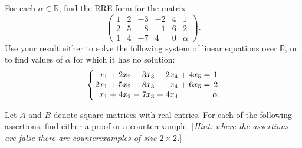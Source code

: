 \documentclass[answers]{exam}
\begin{document}
\begin{questions}



\question%
For each $\alpha \in \mathbb{R}$, find the RRE form for the matrix \[
	\begin{pmatrix}
		1 & 2 & -3 & -2 & 4 & 1 \\
		2 & 5 & -8 & -1 & 6 & 2 \\
		1 & 4 & -7 & 4 & 0 & \alpha
	\end{pmatrix}.
\] Use your result either to solve the following system of linear equations over $\mathbb{R}$, or to find values of $\alpha$ for which it has no solution: \[%
	\arraycolsep=1.4pt
	\left\{\begin{array}{rcrcrcrcrcr}
		x_{1}  &+ &2x_{2} &- &3x_{3} &- &2x_{4} &+ &4x_{5} &= &1 \\
		2x_{1} &+ &5x_{2} &- &8x_{3} &-  &x_{4} &+ &6x_{5} &= &2 \\
		x_{1}  &+ &4x_{2} &- &7x_{3} &+ &4x_{4} &  &       &= &\alpha
	\end{array}\right.
\]



\question%
Let $A$ and $B$ denote square matrices with real entries. For each of the following assertions, find either a proof or a counterexample. [\emph{Hint: where the assertions are false there are counterexamples of size $2 \times 2$.}]
\begin{parts}

\end{parts}
\end{questions}
\end{document}

